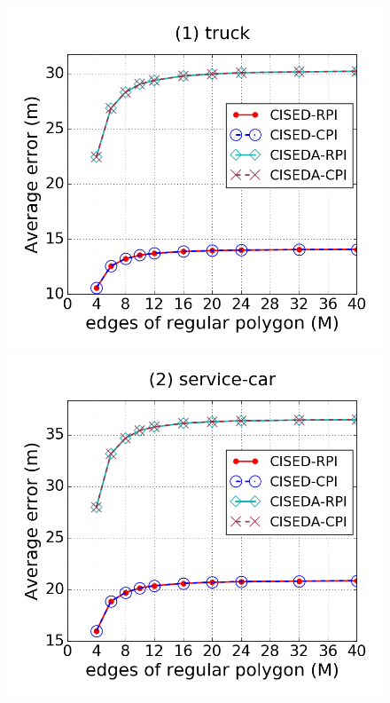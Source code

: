 \begin{figure}[tb!]
\centering
\includegraphics[scale = 0.250]{figures/Exp-M-e-60-error-truck.png}
\includegraphics[scale = 0.250]{figures/Exp-M-e-60-error-service.png}

\end{figure}
